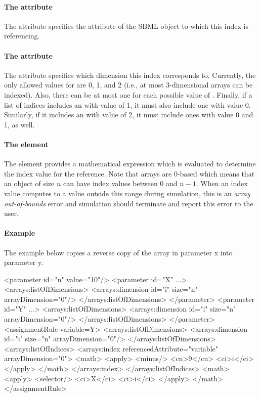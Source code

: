 \paragraph{The  attribute}

The  attribute specifies the attribute of the SBML object to which this index is referencing.  

\paragraph{The  attribute}

The  attribute specifies which dimension this index corresponds to.
Currently, the only allowed values for  are 0, 1, and 2 (i.e., at most 3-dimensional arrays can be indexed).  Also, there can be at most one \Index for each possible value of .  Finally, if a list of indices includes an \Index with  value of 1, it must also include one with value 0.  Similarly, if it includes an \Index with  value of 2, it must include ones with value 0 and 1, as well.

\paragraph{The  element}

The  element provides a mathematical expression which is evaluated to determine the index value for the reference.  Note that arrays are 0-based which means that an object of size $n$ can have index values between 0 and $n-1$.  When an index value computes to a value outside this range during simulation, this is an \emph{array out-of-bounds} error and simulation should terminate and report this error to the user.

\paragraph{Example}

The example below copies a reverse copy of the array in parameter x into parameter y.  

\begin{example}
<parameter id="n" value="10"/>
<parameter id="X" ...>
  <arrays:listOfDimensions>
    <arrays:dimension id="i" size="n" arrayDimension="0"/>
  </arrays:listOfDimensions>
</parameter>
<parameter id="Y" ...>
  <arrays:listOfDimensions>
    <arrays:dimension id="i" size="n" arrayDimension="0"/>
  </arrays:listOfDimensions>
</parameter>
<assignmentRule variable=Y>
  <arrays:listOfDimensions>
    <arrays:dimension id="i" size="n" arrayDimension="0"/>
  </arrays:listOfDimensions>
  <arrays:listOfIndices>
    <arrays:index referencedAttribute="variable" arrayDimension="0">
      <math>
        <apply>
          <minus/>
          <cn>9</cn>
          <ci>i</ci>
        </apply>
      </math>
    </arrays:index>
  </arrays:listOfIndices>
  <math>
    <apply>
      <selector/>
      <ci>X</ci>
      <ci>i</ci>
    </apply>
  </math> 
</assignmentRule>
\end{example}


